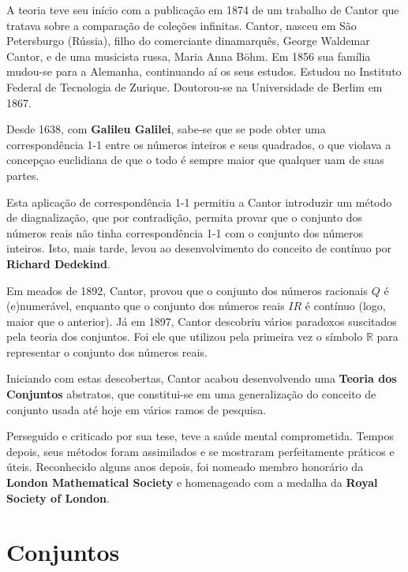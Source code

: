 \inic A teoria teve seu início com a publicação em 1874 de um trabalho de Cantor que tratava sobre a comparação de coleções infinitas. Cantor, nasceu em São Petersburgo (Rússia), filho do comerciante dinamarquês, George Waldemar Cantor, e de uma musicista russa, Maria Anna Böhm. Em 1856 sua família mudou-se para a Alemanha, continuando aí os seus estudos. Estudou no Instituto Federal de Tecnologia de Zurique. Doutorou-se na Universidade de Berlim em 1867.\vskip0.3cm

\inic Desde 1638, com \textbf{Galileu Galilei}, sabe-se que se pode obter uma correspondência 1-1 entre os números inteiros e seus quadrados, o que violava a concepçao euclidiana de que o todo é sempre maior que qualquer uam de suas partes.\vskip0.3cm

\inic Esta aplicação de correspondência 1-1 permitiu a Cantor introduzir um método de diagnalização, que por contradição, permita provar que o conjunto dos números reais não tinha correspondência 1-1 com o conjunto dos números inteiros. Isto, mais tarde, levou ao desenvolvimento do conceito de contínuo por \textbf{Richard Dedekind}. \vskip0.3cm

\inic Em meados de 1892, Cantor, provou que o conjunto dos números racionais $Q$ é (e)numerável, enquanto que o conjunto dos números reais $IR$ é contínuo (logo, maior que o anterior). Já em 1897, Cantor descobriu vários paradoxos suscitados pela teoria dos conjuntos. Foi ele que utilizou pela primeira vez o símbolo ${\displaystyle \mathbb {R}}$ para representar o conjunto dos números reais.\vskip0.3cm


\inic Iniciando com estas descobertas, Cantor acabou desenvolvendo uma \textbf{Teoria dos Conjuntos} abstratos, que constitui-se em uma generalização do conceito de conjunto usada até hoje em vários ramos de pesquisa. \vskip0.3cm


Perseguido e criticado por sua tese, teve a saúde mental comprometida. Tempos depois, seus métodos foram assimilados e se mostraram perfeitamente práticos e úteis. Reconhecido alguns anos depois, foi nomeado membro honorário da \textbf{London Mathematical Society} e homenageado com a medalha da \textbf{Royal Society of London}.\vskip0.3cm



\newpage
\section{Conjuntos}

